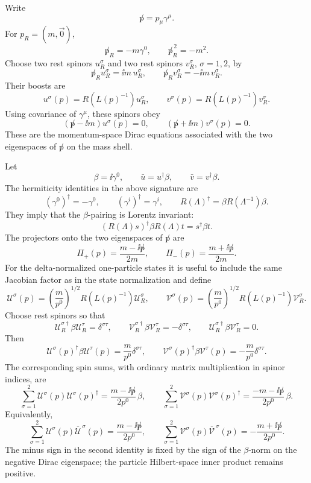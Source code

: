 \begin{proposition}
\label{prop:massive-dirac-projectors-spin-sums}
Write
\[
  \not p=p_\mu\gamma^\mu .
\]
For \(p_R=(m,\vec0)\),
\[
  \not p_R=-m\gamma^0,
  \qquad
  \not p_R^{\,2}=-m^2 .
\]
Choose two rest spinors \(u_R^\sigma\) and two rest spinors \(v_R^\sigma\),
\(\sigma=1,2\), by
\[
  \not p_R u_R^\sigma=\ii m\,u_R^\sigma,
  \qquad
  \not p_R v_R^\sigma=-\ii m\,v_R^\sigma .
\]
Their boosts are
\[
  u^\sigma(p)=R(L(p)^{-1})u_R^\sigma,
  \qquad
  v^\sigma(p)=R(L(p)^{-1})v_R^\sigma .
\]
Using covariance of \(\gamma^\mu\), these spinors obey
\[
  (\not p-\ii m)u^\sigma(p)=0,
  \qquad
  (\not p+\ii m)v^\sigma(p)=0.
\]
These are the momentum-space Dirac equations associated with the two
eigenspaces of \(\not p\) on the mass shell.

Let
\[
  \beta=\ii\gamma^0,
  \qquad
  \bar u=u^\dagger\beta,
  \qquad
  \bar v=v^\dagger\beta .
\]
The hermiticity identities in the above signature are
\[
  (\gamma^0)^\dagger=-\gamma^0,
  \qquad
  (\gamma^i)^\dagger=\gamma^i,
  \qquad
  R(\Lambda)^\dagger=\beta R(\Lambda^{-1})\beta .
\]
They imply that the \(\beta\)-pairing is Lorentz invariant:
\[
  (R(\Lambda)s)^\dagger\beta R(\Lambda)t=s^\dagger\beta t .
\]
The projectors onto the two eigenspaces of \(\not p\) are
\[
  \Pi_+(p)=\frac{m-\ii\not p}{2m},
  \qquad
  \Pi_-(p)=\frac{m+\ii\not p}{2m}.
\]
For the delta-normalized one-particle states it is useful to include the same
Jacobian factor as in the state normalization and define
\[
  \mathcal U^\sigma(p)
  =
  \left(\frac{m}{p^0}\right)^{1/2}R(L(p)^{-1})\mathcal U_R^\sigma,
  \qquad
  \mathcal V^\sigma(p)
  =
  \left(\frac{m}{p^0}\right)^{1/2}R(L(p)^{-1})\mathcal V_R^\sigma .
\]
Choose rest spinors so that
\[
  \mathcal U_R^{\sigma\dagger}\beta\mathcal U_R^\tau=\delta^{\sigma\tau},
  \qquad
  \mathcal V_R^{\sigma\dagger}\beta\mathcal V_R^\tau=-\delta^{\sigma\tau},
  \qquad
  \mathcal U_R^{\sigma\dagger}\beta\mathcal V_R^\tau=0 .
\]
Then
\[
  \mathcal U^\sigma(p)^\dagger\beta\mathcal U^\tau(p)
  =
  \frac{m}{p^0}\delta^{\sigma\tau},
  \qquad
  \mathcal V^\sigma(p)^\dagger\beta\mathcal V^\tau(p)
  =
  -\frac{m}{p^0}\delta^{\sigma\tau}.
\]
The corresponding spin sums, with ordinary matrix multiplication in spinor
indices, are
\[
  \sum_{\sigma=1}^2
  \mathcal U^\sigma(p)\mathcal U^\sigma(p)^\dagger
  =
  \frac{m-\ii\not p}{2p^0}\,\beta,
  \qquad
  \sum_{\sigma=1}^2
  \mathcal V^\sigma(p)\mathcal V^\sigma(p)^\dagger
  =
  \frac{-m-\ii\not p}{2p^0}\,\beta .
\]
Equivalently,
\[
  \sum_{\sigma=1}^2
  \mathcal U^\sigma(p)\overline{\mathcal U}^{\,\sigma}(p)
  =
  \frac{m-\ii\not p}{2p^0},
  \qquad
  \sum_{\sigma=1}^2
  \mathcal V^\sigma(p)\overline{\mathcal V}^{\,\sigma}(p)
  =
  -\frac{m+\ii\not p}{2p^0}.
\]
The minus sign in the second identity is fixed by the sign of the
\(\beta\)-norm on the negative Dirac eigenspace; the particle Hilbert-space
inner product remains positive.
\end{proposition}

